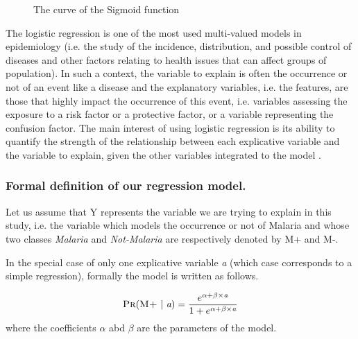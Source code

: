 \begin{figure}[ht]
\centering
{}
\caption{The curve of the Sigmoid function}\label{sigmoid_curve}
\end{figure}

The logistic regression is one of the most used multi-valued models in epidemiology \cite{Am02,Pr05} (i.e. the study of the incidence,
 distribution, and possible control of diseases and other factors relating to health issues that can affect groups of population).
In such a context, the variable to explain is often the occurrence or not of an event like a disease and the explanatory 
variables, i.e. the features, are those that highly impact the occurrence of this event, i.e. variables assessing the exposure to a 
risk factor or a protective factor, or a variable representing the confusion factor.
The main interest of using logistic regression is its ability to quantify the strength of the relationship between each explicative 
variable and the variable to explain, given the other variables integrated to the model \cite{Am02}. 

\subsubsection{Formal definition  of our regression  model.}
Let us assume that \textsc{Y} represents the variable we are trying to explain in this study, i.e. the variable which models the occurrence or not of Malaria and whose 
two classes \emph{Malaria} and \emph{Not-Malaria} are respectively denoted by \textsc{M+} and \textsc{M-}. 

In the special case of only one explicative variable \emph{a} (which case corresponds to a simple regression), formally
the model is written as follows.

\begin{equation}
\textsc{Pr}(\textsc{M+} ~|~ \emph{a}) = \frac{e^{\alpha + \beta\times \emph{a} }}{1 + e^{\alpha + \beta\times \emph{a} }}
\label{simple_regression}
\end{equation}
where the coefficients $\alpha$ abd $\beta$ are the parameters of the model.

